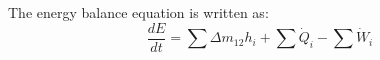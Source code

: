 The energy balance equation is written as:  
\[
\frac{dE}{dt} = \sum \Delta m_{12} h_{i} + \sum \dot{Q}_{i} - \sum \dot{W}_{i}
\]